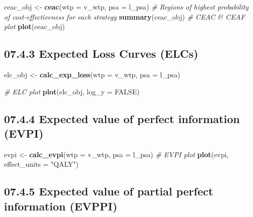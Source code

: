 \documentclass[
]{article}
\newenvironment{Shaded}{\begin{snugshade}}{\end{snugshade}}
\newcommand{\CommentTok}[1]{\textcolor[rgb]{0.56,0.35,0.01}{\textit{#1}}}
\newcommand{\DataTypeTok}[1]{\textcolor[rgb]{0.13,0.29,0.53}{#1}}
\newcommand{\KeywordTok}[1]{\textcolor[rgb]{0.13,0.29,0.53}{\textbf{#1}}}
\newcommand{\NormalTok}[1]{#1}
\newcommand{\OtherTok}[1]{\textcolor[rgb]{0.56,0.35,0.01}{#1}}
\newcommand{\StringTok}[1]{\textcolor[rgb]{0.31,0.60,0.02}{#1}}
\begin{document}
\begin{Shaded}
\begin{Highlighting}[]
\NormalTok{ceac_obj <-}\StringTok{ }\KeywordTok{ceac}\NormalTok{(}\DataTypeTok{wtp =}\NormalTok{ v_wtp, }\DataTypeTok{psa =}\NormalTok{ l_psa)}
\CommentTok{# Regions of highest probability of cost-effectiveness for each strategy}
\KeywordTok{summary}\NormalTok{(ceac_obj)}
\CommentTok{# CEAC & CEAF plot}
\KeywordTok{plot}\NormalTok{(ceac_obj)}
\end{Highlighting}
\end{Shaded}

\hypertarget{expected-loss-curves-elcs}{%
\subsection{07.4.3 Expected Loss Curves
(ELCs)}\label{expected-loss-curves-elcs}}

\begin{Shaded}
\begin{Highlighting}[]
\NormalTok{elc_obj <-}\StringTok{ }\KeywordTok{calc_exp_loss}\NormalTok{(}\DataTypeTok{wtp =}\NormalTok{ v_wtp, }\DataTypeTok{psa =}\NormalTok{ l_psa)}

\CommentTok{# ELC plot}
\KeywordTok{plot}\NormalTok{(elc_obj, }\DataTypeTok{log_y =} \OtherTok{FALSE}\NormalTok{)}
\end{Highlighting}
\end{Shaded}

\hypertarget{expected-value-of-perfect-information-evpi}{%
\subsection{07.4.4 Expected value of perfect information
(EVPI)}\label{expected-value-of-perfect-information-evpi}}

\begin{Shaded}
\begin{Highlighting}[]
\NormalTok{evpi <-}\StringTok{ }\KeywordTok{calc_evpi}\NormalTok{(}\DataTypeTok{wtp =}\NormalTok{ v_wtp, }\DataTypeTok{psa =}\NormalTok{ l_psa)}
\CommentTok{# EVPI plot}
\KeywordTok{plot}\NormalTok{(evpi, }\DataTypeTok{effect_units =} \StringTok{"QALY"}\NormalTok{) }
\end{Highlighting}
\end{Shaded}

\hypertarget{expected-value-of-partial-perfect-information-evppi}{%
\subsection{07.4.5 Expected value of partial perfect information
(EVPPI)}\label{expected-value-of-partial-perfect-information-evppi}}
\end{document}
